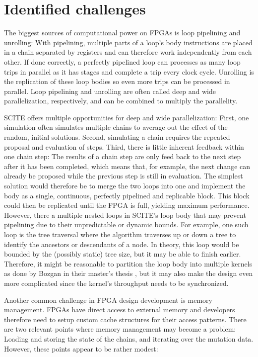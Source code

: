 \section{Identified challenges}

The biggest sources of computational power on \acp{FPGA} is loop pipelining and unrolling: With pipelining, multiple parts of a loop's body instructions are placed in a chain separated by registers and can therefore work independently from each other. If done correctly, a perfectly pipelined loop can processes as many loop trips in parallel as it has stages and complete a trip every clock cycle. Unrolling is the replication of these loop bodies so even more trips can be processed in parallel. Loop pipelining and unrolling are often called deep and wide parallelization, respectively, and can be combined to multiply the parallelity.

\ac{SCITE} offers multiple opportunities for deep and wide parallelization: First, one simulation often simulates multiple chains to average out the effect of the random, initial solutions. Second, simulating a chain requires the repeated proposal and evaluation of steps. Third, there is little inherent feedback within one chain step: The results of a chain step are only feed back to the next step after it has been completed, which means that, for example, the next change can already be proposed while the previous step is still in evaluation. The simplest solution would therefore be to merge the two loops into one and implement the body as a single, continuous, perfectly pipelined and replicable block. This block could then be replicated until the \ac{FPGA} is full, yielding maximum performance. However, there a multiple nested loops in \ac{SCITE}'s loop body that may prevent pipelining due to their unpredictable or dynamic bounds. For example, one such loop is the tree traversal where the algorithm traverses up or down a tree to identify the ancestors or descendants of a node. In theory, this loop would be bounded by the (possibly static) tree size, but it may be able to finish earlier. Therefore, it might be reasonable to partition the loop body into multiple kernels as done by Bozgan in their master's thesis \cite{bozgan_2019}, but it may also make the design even more complicated since the kernel's throughput needs to be synchronized.

Another common challenge in \ac{FPGA} design development is memory management. \acp{FPGA} have direct access to external memory and developers therefore need to setup custom cache structures for their access patterns. There are two relevant points where memory management may become a problem: Loading and storing the state of the chains, and iterating over the mutation data. However, these points appear to be rather modest:


